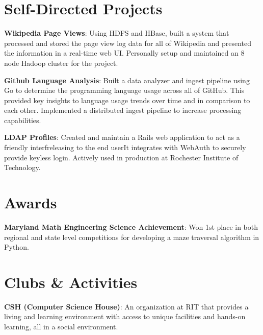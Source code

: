 \documentclass[a4paper,margin,line]{resume}
\begin{document}
\begin{resume}
\section{\mysidestyle Self-Directed Projects}
    \begin{asparablank}
        \item \textbf{Wikipedia Page Views}: Using HDFS and HBase, built a system that
            processed and stored the page view log data for all of Wikipedia 
            and presented the information in a real-time web UI. Personally setup and 
            maintained an 8 node Hadoop cluster for the project. \\
        \item \textbf{Github Language Analysis}: Built a data analyzer and
            ingest pipeline using Go to determine the programming language 
            usage across all of GitHub. This provided key insights to language usage
            trends over time and in comparison to each other. Implemented a 
            distributed ingest pipeline to increase processing capabilities. \\
        \item \textbf{LDAP Profiles}: Created and maintain a Rails web 
            application to act as a friendly interfreleasing to the end userIt 
            integrates with WebAuth to securely provide keyless login. 
            Actively used in production at Rochester Institute of Technology.
    \end{asparablank}
\section{\mysidestyle Awards}
    \begin{asparablank}
        \item \textbf{Maryland Math Engineering Science Achievement}: Won 1st place
            in both regional and state level competitions for developing a maze
            traversal algorithm in Python. 
    \end{asparablank}
\section{\mysidestyle Clubs \& Activities}
    \begin{asparablank}
        \item \textbf{CSH (Computer Science House)}: An organization at RIT that
            provides a living and learning environment with access to unique facilities
            and hands-on learning, all in a social environment.
    \end{asparablank}
\end{resume}
\end{document}
